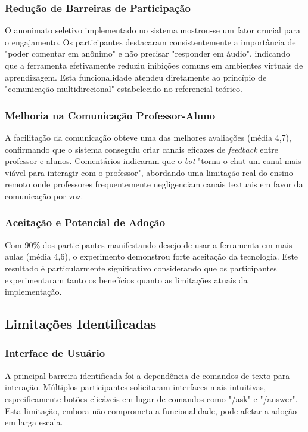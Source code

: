 \subsubsection{Redução de Barreiras de Participação}

O anonimato seletivo implementado no sistema mostrou-se um fator crucial para o
engajamento. Os participantes destacaram consistentemente a importância de
"poder comentar em anônimo" e não precisar "responder em áudio", indicando que
a ferramenta efetivamente reduziu inibições comuns em ambientes virtuais de
aprendizagem. Esta funcionalidade atendeu diretamente ao princípio de
"comunicação multidirecional" estabelecido no referencial teórico.

\subsubsection{Melhoria na Comunicação Professor-Aluno}

A facilitação da comunicação obteve uma das melhores avaliações (média 4,7),
confirmando que o sistema conseguiu criar canais eficazes de \textit{feedback}
entre professor e alunos. Comentários indicaram que o \textit{bot} "torna o chat
um canal mais viável para interagir com o professor", abordando uma limitação
real do ensino remoto onde professores frequentemente negligenciam canais
textuais em favor da comunicação por voz.

\subsubsection{Aceitação e Potencial de Adoção}

Com 90\% dos participantes manifestando desejo de usar a ferramenta em mais
aulas (média 4,6), o experimento demonstrou forte aceitação da tecnologia. Este
resultado é particularmente significativo considerando que os participantes
experimentaram tanto os benefícios quanto as limitações atuais da implementação.

\subsection{Limitações Identificadas}

\subsubsection{Interface de Usuário}

A principal barreira identificada foi a dependência de comandos de texto para
interação. Múltiplos participantes solicitaram interfaces mais intuitivas,
especificamente botões clicáveis em lugar de comandos como "/ask" e "/answer".
Esta limitação, embora não comprometa a funcionalidade, pode afetar a adoção em
larga escala.

